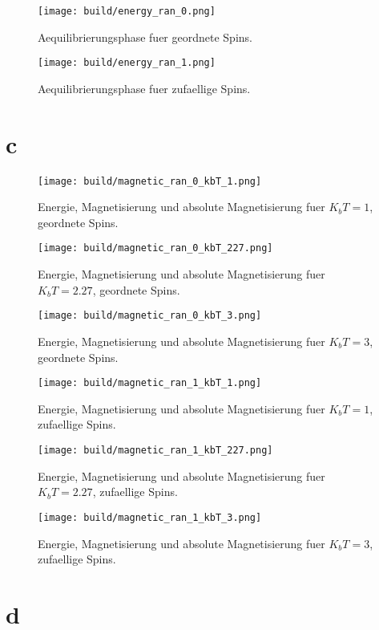 \documentclass{scrartcl}
\begin{document}
\begin{figure}[ht]
  \centering
  \texttt{[image: build/energy\_ran\_0.png]}
  \caption{Aequilibrierungsphase fuer geordnete Spins.}
\end{figure}
\begin{figure}[ht]
  \centering
  \texttt{[image: build/energy\_ran\_1.png]}
  \caption{Aequilibrierungsphase fuer zufaellige Spins.}
\end{figure}
\FloatBarrier
\newpage
\section*{c}
\begin{figure}[ht]
  \centering
  \texttt{[image: build/magnetic\_ran\_0\_kbT\_1.png]}
  \caption{Energie, Magnetisierung und absolute Magnetisierung fuer $K_b T = 1$, geordnete Spins.}
\end{figure}
\begin{figure}[ht]
  \centering
  \texttt{[image: build/magnetic\_ran\_0\_kbT\_227.png]}
  \caption{Energie, Magnetisierung und absolute Magnetisierung fuer $K_b T = 2.27$, geordnete Spins.}
\end{figure}
\begin{figure}[ht]
  \centering
  \texttt{[image: build/magnetic\_ran\_0\_kbT\_3.png]}
  \caption{Energie, Magnetisierung und absolute Magnetisierung fuer $K_b T = 3$, geordnete Spins.}
\end{figure}
\begin{figure}[ht]
  \centering
  \texttt{[image: build/magnetic\_ran\_1\_kbT\_1.png]}
  \caption{Energie, Magnetisierung und absolute Magnetisierung fuer $K_b T = 1$, zufaellige Spins.}
\end{figure}
\begin{figure}[ht]
  \centering
  \texttt{[image: build/magnetic\_ran\_1\_kbT\_227.png]}
  \caption{Energie, Magnetisierung und absolute Magnetisierung fuer $K_b T = 2.27$, zufaellige Spins.}
\end{figure}
\begin{figure}[ht]
  \centering
  \texttt{[image: build/magnetic\_ran\_1\_kbT\_3.png]}
  \caption{Energie, Magnetisierung und absolute Magnetisierung fuer $K_b T = 3$, zufaellige Spins.}
\end{figure}
\FloatBarrier
\newpage
\section*{d}
\FloatBarrier
\newpage
\end{document}
